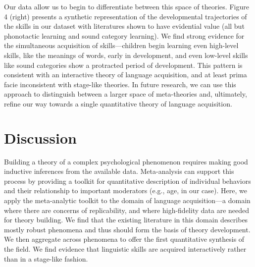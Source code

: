 \documentclass[9pt,twocolumn,twoside,lineno]{pnas-new}
\begin{document}
Our data allow us to begin to differentiate between this space of
theories. Figure 4 (right) presents a synthetic representation of the
developmental trajectories of the skills in our dataset with literatures
shown to have evidential value (all but phonotactic learning and sound
category learning). We find strong evidence for the simultaneous
acquisition of skills---children begin learning even high-level skills,
like the meanings of words, early in development, and even low-level
skills like sound categories show a protracted period of development.
This pattern is consistent with an interactive theory of language
acquisition, and at least prima facie inconsistent with stage-like
theories. In future research, we can use this approach to distinguish
between a larger space of meta-theories and, ultimately, refine our way
towards a single quantitative theory of language acquisition.

\section*{Discussion}\label{discussion}

Building a theory of a complex psychological phenomenon requires making
good inductive inferences from the available data. Meta-analysis can
support this process by providing a toolkit for quantitative description
of individual behaviors and their relationship to important moderators
(e.g., age, in our case). Here, we apply the meta-analytic toolkit to
the domain of language acquisition---a domain where there are concerns
of replicability, and where high-fidelity data are needed for theory
building. We find that the existing literature in this domain describes
mostly robust phenomena and thus should form the basis of theory
development. We then aggregate across phenomena to offer the first
quantitative synthesis of the field. We find evidence that linguistic
skills are acquired interactively rather than in a stage-like fashion.
\end{document}
